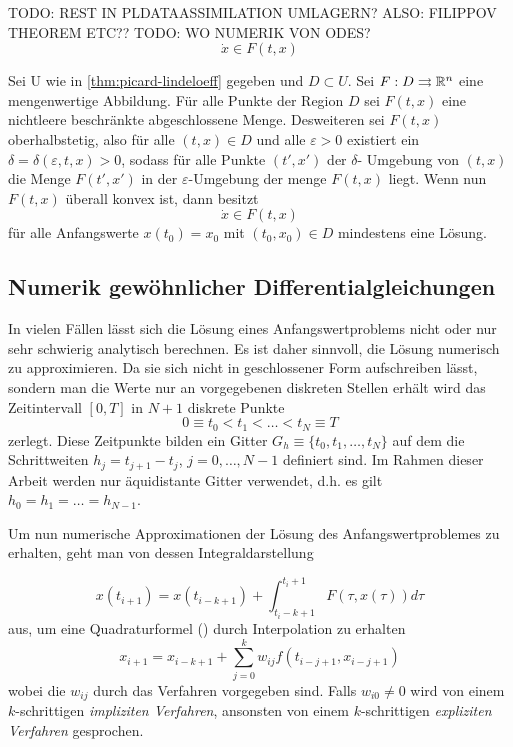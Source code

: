TODO: REST IN PLDATAASSIMILATION UMLAGERN? ALSO: FILIPPOV THEOREM ETC??
TODO: WO NUMERIK VON ODES?
\[
 \dot x \in F(t,x)
\]
\cite{filippov1971existence}
\begin{theorem}[Filippov]
 Sei U wie in \ref{thm:picard-lindeloeff} gegeben und $D\subset U$. Sei $F:D\rightrightarrows \mathbb{R}^n$ eine mengenwertige Abbildung. Für alle Punkte der Region $D$ sei $F(t,x)$ eine nichtleere beschränkte abgeschlossene Menge. Desweiteren sei $F(t,x)$ oberhalbstetig, also für alle $(t,x)\in D$ und alle $\varepsilon>0$ existiert ein $\delta = \delta(\varepsilon,t,x)>0$, sodass für alle Punkte $(t',x')$ der $\delta$- Umgebung von $(t,x)$ die Menge $F(t',x')$ in der $\varepsilon$-Umgebung der menge $F(t,x)$ liegt.
 Wenn nun $F(t,x)$ überall konvex ist, dann besitzt  
 \[
  \dot x \in F(t,x)
 \]
 für alle Anfangswerte $x(t_0)=x_0$ mit $(t_0,x_0)\in D$ mindestens eine Lösung.
\end{theorem}


\subsection{Numerik gewöhnlicher Differentialgleichungen}
In vielen Fällen lässt sich die Lösung eines Anfangswertproblems nicht oder nur sehr schwierig analytisch berechnen. Es ist daher sinnvoll, die Lösung numerisch zu approximieren. Da sie sich nicht in geschlossener Form aufschreiben lässt, sondern man die Werte nur an vorgegebenen diskreten Stellen erhält wird das Zeitintervall $[0,T]$ in $N+1$ diskrete Punkte
\[
 0\equiv t_0<t_1<\ldots < t_N \equiv T
\]
zerlegt. Diese Zeitpunkte bilden ein Gitter $G_h \equiv \lbrace t_0,t_1,\ldots, t_N\rbrace $ auf dem die Schrittweiten $h_j= t_{j+1}-t_j$, $j=0,\ldots, N-1$ definiert sind. Im Rahmen dieser Arbeit werden nur äquidistante Gitter verwendet, d.h. es gilt $h_0=h_1 = \ldots = h_{N-1}$. 

Um nun numerische Approximationen der Lösung des Anfangswertproblemes zu erhalten, geht man von dessen Integraldarstellung 

\[
 x(t_{i+1}) = x(t_{i-k+1}) + \int_{t_i-k+1}^{t_i+1} F(\tau,x(\tau))d\tau
\]
aus, um eine Quadraturformel (\cite[(1.55)]{hermann2004numerik}) durch Interpolation zu erhalten
\[
 x_{i+1} = x_{i-k+1} + \sum_{j=0}^k w_{ij} f(t_{i-j+1},x_{i-j+1})
\]
wobei die $w_{ij}$ durch das Verfahren vorgegeben sind. Falls $w_{i0}\neq 0$ wird von einem $k$-schrittigen \textit{impliziten Verfahren}, ansonsten von einem $k$-schrittigen \textit{expliziten Verfahren} gesprochen.

